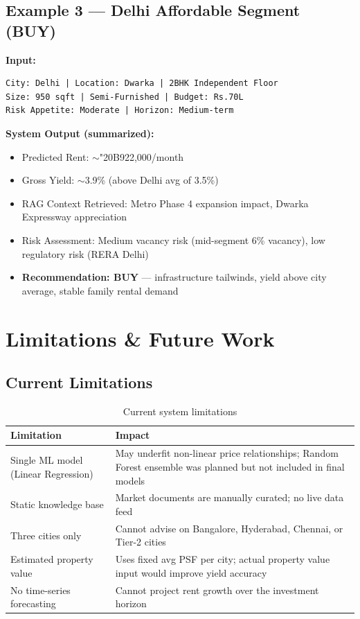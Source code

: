 \documentclass[12pt,a4paper]{article}
\newcommand{\rupee}{{\fontencoding{T1}\selectfont\char"20B9}}
\begin{document}
\subsection{Example 3 --- Delhi Affordable Segment (\textcolor{green!60!black}{BUY})}

\textbf{Input:}
\begin{lstlisting}[language={}]
City: Delhi | Location: Dwarka | 2BHK Independent Floor
Size: 950 sqft | Semi-Furnished | Budget: Rs.70L
Risk Appetite: Moderate | Horizon: Medium-term
\end{lstlisting}

\textbf{System Output (summarized):}
\begin{itemize}[leftmargin=1.5em]
  \item Predicted Rent: $\sim$\rupee 22{,}000/month
  \item Gross Yield: $\sim$3.9\% (above Delhi avg of 3.5\%)
  \item RAG Context Retrieved: Metro Phase 4 expansion impact, Dwarka Expressway appreciation
  \item Risk Assessment: Medium vacancy risk (mid-segment 6\% vacancy), low regulatory risk (RERA Delhi)
  \item \textbf{Recommendation: BUY} --- infrastructure tailwinds, yield above city average, stable family rental demand
\end{itemize}

\section{Limitations \& Future Work}

\subsection{Current Limitations}

\begin{table}[H]
\centering
\caption{Current system limitations}
\begin{tabularx}{\textwidth}{lX}
\toprule
\textbf{Limitation} & \textbf{Impact} \\
\midrule
Single ML model (Linear Regression) & May underfit non-linear price relationships; Random Forest ensemble was planned but not included in final models \\
Static knowledge base               & Market documents are manually curated; no live data feed \\
Three cities only                   & Cannot advise on Bangalore, Hyderabad, Chennai, or Tier-2 cities \\
Estimated property value            & Uses fixed avg PSF per city; actual property value input would improve yield accuracy \\
No time-series forecasting          & Cannot project rent growth over the investment horizon \\
\bottomrule
\end{tabularx}
\end{table}
\end{document}
